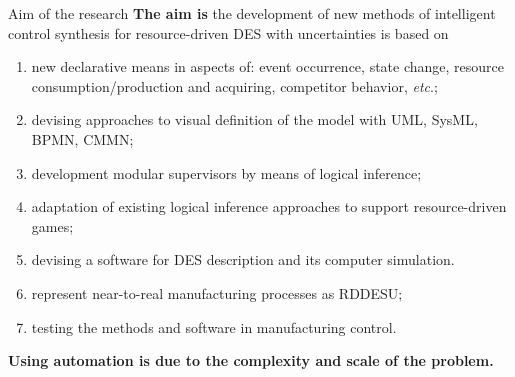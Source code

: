 \documentclass[10pt,dvipsnames]{beamer}
\begin{document}
\begin{frame}{Aim of the research}
\textbf{The aim is} the development of new methods of intelligent control synthesis for resource-driven DES with uncertainties is based on
\begin{enumerate}
\item new declarative means in aspects of: event occurrence, state change, resource consumption/production and acquiring, competitor behavior, \emph{etc}.;
\item devising approaches to visual definition of the model with UML, SysML, BPMN, CMMN;
\item development modular supervisors by means of logical inference;
\item adaptation of existing logical inference approaches to support resource-driven games;
\item devising a software for DES description and its computer simulation.
\item represent near-to-real manufacturing processes as RDDESU;
\item testing the methods and software in manufacturing control.
\end{enumerate}

\textbf{Using automation is due to the complexity and scale of the problem.}
\end{frame}
\end{document}
